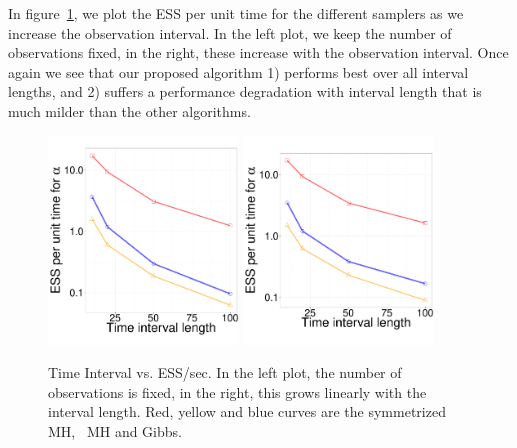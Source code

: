 {In figure~\ref{fig:jc_model_vs_t}, we plot the ESS per unit time for the
different samplers as we increase the observation interval. In the left plot,
we keep the number of observations fixed, in the right, these increase with
the observation interval. Once again we see that our proposed algorithm
1) performs best over all interval lengths, and 2) suffers a performance
degradation with interval length that is much milder than the other algorithms.
  \begin{figure}%
  \centering
  \begin{minipage}[!hp]{0.73\linewidth}
  \centering
    \includegraphics [width=0.45\textwidth, angle=0]{figures_new_apr12/alpha_ESS_T_JC_nonfix_18apr27.pdf}
	\vspace{.3in}
  \centering
    \includegraphics [width=0.45\textwidth, angle=0]{figures_new_apr12/alpha_ESS_T_JC_fix_18apr27.pdf}
  \end{minipage}
  \begin{minipage}[!hp]{0.25\linewidth}
    \caption{Time Interval vs. ESS/sec. In the left plot, the number of 
    observations is fixed, in the right, this grows linearly with the
  interval length. Red, yellow and blue curves are the symmetrized MH,
  \naive\ MH and Gibbs. }
	\label{fig:jc_model_vs_t}
  \end{minipage}
  \end{figure}


}
